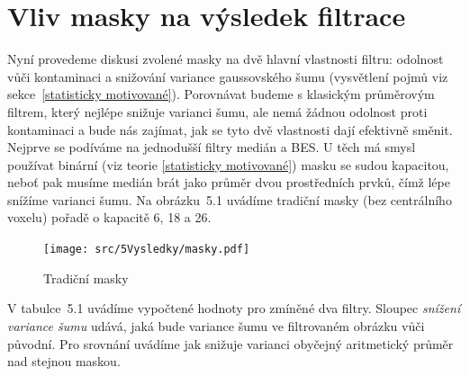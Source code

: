 
\section{Vliv masky na výsledek filtrace}\label{diskuse masky}

    Nyní provedeme diskusi zvolené masky na dvě hlavní vlastnosti filtru: odolnost vůči kontaminaci a snižování variance gaussovského šumu (vysvětlení pojmů viz sekce~\ref{statisticky motivované}). Porovnávat budeme s klasickým průměrovým filtrem, který nejlépe snižuje varianci šumu, ale nemá žádnou odolnost proti kontaminaci a bude nás zajímat, jak se tyto dvě vlastnosti dají efektivně směnit. Nejprve se podíváme na jednodušší filtry medián a BES. U těch má smysl používat binární (viz teorie \ref{statisticky motivované}) masku se sudou kapacitou, neboť pak musíme medián brát jako průměr dvou prostředních prvků, čímž lépe snížíme varianci šumu. Na obrázku~5.1 uvádíme tradiční masky (bez centrálního voxelu) pořadě o kapacitě 6, 18 a 26.

\begin{figure}[h]\label{obr masky}
  \texttt{[image: src/5Vysledky/masky.pdf]}
  \caption{Tradiční masky}
\end{figure}

    V tabulce~5.1 uvádíme vypočtené hodnoty pro zmíněné dva filtry. Sloupec \emph{snížení variance šumu} udává, jaká bude variance šumu ve filtrovaném obrázku vůči původní. Pro srovnání uvádíme jak snižuje varianci obyčejný aritmetický průměr nad stejnou maskou.

